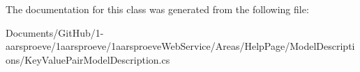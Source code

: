 The documentation for this class was generated from the following file\+:\begin{DoxyCompactItemize}
\item 
Documents/\+Git\+Hub/1-\/aarsproeve/1aarsproeve/1aarsproeve\+Web\+Service/\+Areas/\+Help\+Page/\+Model\+Descriptions/Key\+Value\+Pair\+Model\+Description.\+cs\end{DoxyCompactItemize}
